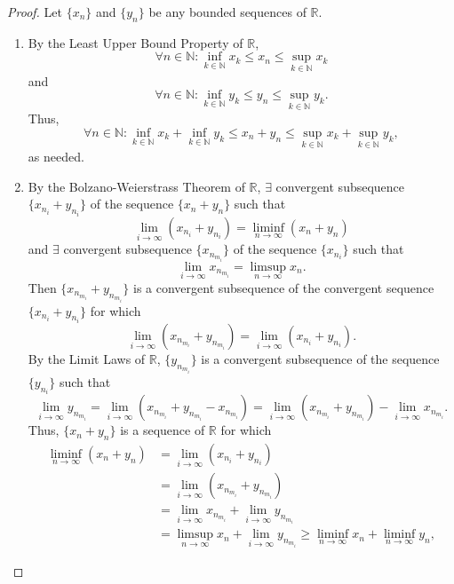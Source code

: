 \documentclass[12pt]{article}
\theoremstyle{definition}
\begin{document}
\begin{proof}
    Let $\{x_n\}$ and $\{y_n\}$ be any bounded sequences of $\mathbb{R}$.
    \begin{enumerate}[label=\alph*)]
        \item By the Least Upper Bound Property of $\mathbb{R}$,
        \[
            \forall n \in \mathbb{N} : \inf_{k \in \mathbb{N}}x_k \leq x_n \leq \sup_{k \in \mathbb{N}}x_k
        \]
        and
        \[
            \forall n \in \mathbb{N} : \inf_{k \in \mathbb{N}}y_k \leq y_n \leq \sup_{k \in \mathbb{N}}y_k.
        \]
        Thus,
        \[
            \forall n \in \mathbb{N} : \inf_{k \in \mathbb{N}}x_k + \inf_{k \in \mathbb{N}}y_k \leq x_n + y_n \leq \sup_{k \in \mathbb{N}}x_k + \sup_{k \in \mathbb{N}}y_k,
        \]
        as needed.
        \item By the Bolzano-Weierstrass Theorem of $\mathbb{R}$, $\exists$ convergent subsequence $\{x_{n_i} + y_{n_i}\}$ of the sequence $\{x_n + y_n\}$ such that 
        \[
            \lim_{i \to \infty}(x_{n_i} + y_{n_i}) = \liminf_{n \to \infty}(x_n + y_n)
        \]
        and $\exists$ convergent subsequence $\{x_{n_{m_i}}\}$ of the sequence $\{x_{n_i}\}$ such that
        \[
            \lim_{i \to \infty}x_{n_{m_i}} = \limsup_{n \to \infty}x_n.
        \]
        Then $\{x_{n_{m_i}} + y_{n_{m_i}}\}$ is a convergent subsequence of the convergent sequence $\{x_{n_i} + y_{n_i}\}$ for which
        \[
            \lim_{i \to \infty}(x_{n_{m_i}} + y_{n_{m_i}}) = \lim_{i \to \infty}(x_{n_i} + y_{n_i}).
        \]
        By the Limit Laws of $\mathbb{R}$, $\{y_{n_{m_i}}\}$ is a convergent subsequence of the sequence $\{y_{n_i}\}$ such that
        \[
            \lim_{i \to \infty}y_{n_{m_i}} = \lim_{i \to \infty}(x_{n_{m_i}} + y_{n_{m_i}} - x_{n_{m_i}}) = \lim_{i \to \infty}(x_{n_{m_i}} + y_{n_{m_i}}) - \lim_{i \to \infty}x_{n_{m_i}}.
        \]
        Thus, $\{x_n + y_n\}$ is a sequence of $\mathbb{R}$ for which
        \begin{align*}
            \liminf_{n \to \infty}(x_n + y_n) &= \lim_{i \to \infty}(x_{n_i} + y_{n_i}) \\
            &= \lim_{i \to \infty}(x_{n_{m_i}} + y_{n_{m_i}}) \\ 
            &= \lim_{i \to \infty}x_{n_{m_i}} + \lim_{i \to \infty}y_{n_{m_i}} \\
            &= \limsup_{n \to \infty}x_n + \lim_{i \to \infty}y_{n_{m_i}} \geq \liminf_{n \to \infty}x_n + \liminf_{n \to \infty}y_n,
        \end{align*}

\end{enumerate}
\end{proof}
\end{document}
